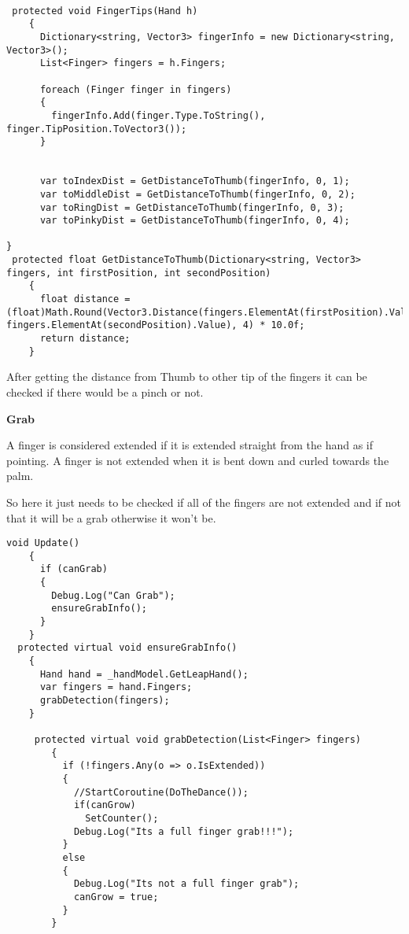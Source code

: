 {\begin{lstlisting}[caption= {Pinching detection in Kyno},label={pinch}]

 protected void FingerTips(Hand h)
    {
      Dictionary<string, Vector3> fingerInfo = new Dictionary<string, Vector3>();
      List<Finger> fingers = h.Fingers;

      foreach (Finger finger in fingers)
      {
        fingerInfo.Add(finger.Type.ToString(), finger.TipPosition.ToVector3());
      }


      var toIndexDist = GetDistanceToThumb(fingerInfo, 0, 1);
      var toMiddleDist = GetDistanceToThumb(fingerInfo, 0, 2);
      var toRingDist = GetDistanceToThumb(fingerInfo, 0, 3);
      var toPinkyDist = GetDistanceToThumb(fingerInfo, 0, 4);
      
}
 protected float GetDistanceToThumb(Dictionary<string, Vector3> fingers, int firstPosition, int secondPosition)
    {
      float distance = (float)Math.Round(Vector3.Distance(fingers.ElementAt(firstPosition).Value, fingers.ElementAt(secondPosition).Value), 4) * 10.0f;
      return distance;
    }
\end{lstlisting}

After getting the distance from Thumb to other tip of the fingers it can be checked if there would be a pinch or not.

\textbf{Grab}

A finger is considered extended if it is extended straight from the hand as if pointing. A finger is not extended when it is bent down and curled towards the palm.

So here it just needs to be checked if all of the fingers are not extended and if not that it will be a grab otherwise it won't be.
\begin{lstlisting}[caption={Grab detection in Kyno},label={createController}]
 void Update()
    {
      if (canGrab)
      {
        Debug.Log("Can Grab");
        ensureGrabInfo();
      }
    }
  protected virtual void ensureGrabInfo()
    {
      Hand hand = _handModel.GetLeapHand();
      var fingers = hand.Fingers;
      grabDetection(fingers);
    }
    
     protected virtual void grabDetection(List<Finger> fingers)
        {
          if (!fingers.Any(o => o.IsExtended))
          {
            //StartCoroutine(DoTheDance());
            if(canGrow)
              SetCounter();
            Debug.Log("Its a full finger grab!!!");
          }
          else
          {
            Debug.Log("Its not a full finger grab");
            canGrow = true;
          }
        }
\end{lstlisting}


}
